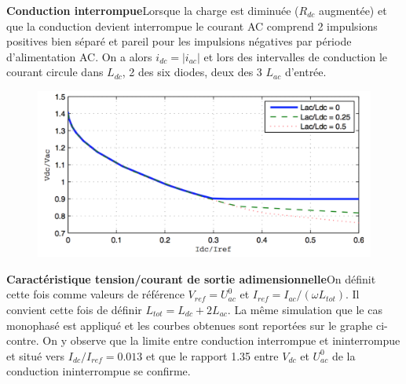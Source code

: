 		\textbf{Conduction interrompue}\qquad Lorsque la charge est diminuée ($R_{dc}$ augmentée) et que la conduction devient interrompue le courant AC comprend 2 impulsions positives bien séparé et pareil pour les impulsions négatives par période d'alimentation AC. On a alors $i_{dc} = |i_{ac}|$ et lors des intervalles de conduction le courant circule dans $L_{dc}$, 2 des six diodes, deux des 3 $L_{ac}$ d'entrée. \\
		
		\begin{figure}
		\vspace{-5mm}
		\includegraphics[scale=0.3]{ch2/17}
		\end{figure} 
		\textbf{Caractéristique tension/courant de sortie adimensionnelle}\qquad 		 On définit cette fois comme valeurs de référence $V_{ref} = U_{ac}^0$ et $I_{ref} = I_{ac}/(\omega L_{tot})$. Il convient cette fois de définir $L_{tot} = L_{dc}+ 2L_{ac}$. La même simulation que le cas monophasé est appliqué et les courbes obtenues sont reportées sur le graphe ci-contre. On y observe que la limite entre conduction interrompue et ininterrompue et situé vers $I_{dc}/I_{ref} = 0.013$ et que le rapport 1.35 entre $V_{dc}$ et $U_{ac}^0$ de la conduction ininterrompue se confirme. 